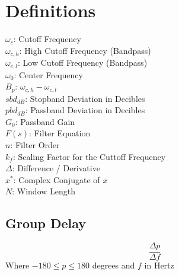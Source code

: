\documentclass[11pt, oneside]{article}
\begin{document}
\section{Definitions}
$\omega_c$: Cutoff Frequency\\
$\omega_{c,h}$: High Cutoff Frequency (Bandpass)\\
$\omega_{c,l}$: Low Cutoff Frequency (Bandpass)\\
$\omega_0$: Center Frequency\\
$B_p$: $\omega_{c,h}-\omega_{c,l}$\\
$sbd_{dB}$: Stopband Deviation in Decibles\\
$pbd_{dB}$: Passband Deviation in Decibles\\
$G_0$: Passband Gain\\
$F(s)$: Filter Equation\\
$n$: Filter Order\\
$k_f$: Scaling Factor for the Cuttoff Frequency\\
$\Delta$: Difference / Derivative\\
$x^*$: Complex Conjugate of $x$\\ 
$N$: Window Length

\subsection{Group Delay}
\[\frac{\Delta p}{\Delta f}\] Where $-180 \leq p \leq 180$ degrees and $f$ in Hertz

\end{document}
